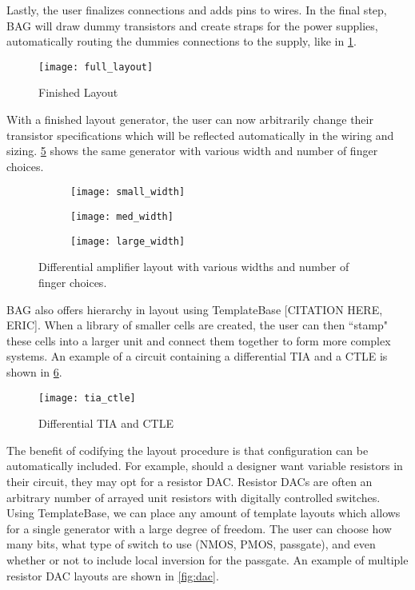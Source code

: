 Lastly, the user finalizes connections and adds pins to wires. In the final step, BAG will draw dummy transistors and create straps for the power supplies, automatically routing the dummies connections to the supply, like in \ref{fig:finished_layout}.
\begin{figure}[h]
\centering
\texttt{[image: full\_layout]}
\caption{Finished Layout}
\label{fig:finished_layout}
\end{figure}
With a finished layout generator, the user can now arbitrarily change their transistor specifications which will be reflected automatically in the wiring and sizing. \ref{fig:width_changes} shows the same generator with various width and number of finger choices.
\begin{figure}[h]
\centering
\begin{subfigure}{.4\linewidth}
  \centering
  \texttt{[image: small\_width]}
  \caption{}
  \label{fig:sfig1}
\end{subfigure}
\begin{subfigure}{.4\linewidth}
  \centering
\texttt{[image: med\_width]}
  \caption{}
  \label{fig:sfig2}
\end{subfigure}
\begin{subfigure}{.4\linewidth}
  \centering
\texttt{[image: large\_width]}
  \caption{}
  \label{fig:sfig2}
\end{subfigure}
\caption{Differential amplifier layout with various widths and number of finger choices.}
\label{fig:width_changes}
\end{figure}
\clearpage
BAG also offers hierarchy in layout using TemplateBase [CITATION HERE, ERIC]. When a library of smaller cells are created, the user can then ``stamp" these cells into a larger unit and connect them together to form more complex systems. An example of a circuit containing a differential TIA and a CTLE is shown in \ref{fig:tia_ctle}.
\begin{figure}[h]
\centering
\texttt{[image: tia\_ctle]}
\caption{Differential TIA and CTLE}
\label{fig:tia_ctle}
\end{figure}
The benefit of codifying the layout procedure is that configuration can be automatically included. For example, should a designer want variable resistors in their circuit, they may opt for a resistor DAC. Resistor DACs are often an arbitrary number of arrayed unit resistors with digitally controlled switches. Using TemplateBase, we can place any amount of template layouts which allows for a single generator with a large degree of freedom. The user can choose how many bits, what type of switch to use (NMOS, PMOS, passgate), and even whether or not to include local inversion for the passgate. An example of multiple resistor DAC layouts are shown in \ref{fig:dac}.

